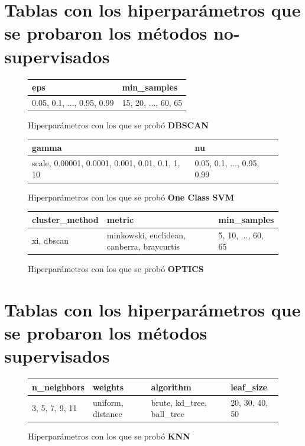 \begin{appendices}
	\section*{Tablas con los hiperparámetros que se probaron los métodos no-supervisados}
		\begin{figure}[htb]
			\centering
			\begin{tabular}{ll}
				\toprule
				                                          eps &                                  min\_samples \\
				\midrule
				  0.05, 0.1, ..., 0.95, 0.99 &  15, 20, ..., 60, 65 \\
				\bottomrule
			\end{tabular}
			\caption{Hiperparámetros con los que se probó \textbf{DBSCAN}}
			\label{table:4}
		\end{figure}
		
		\begin{figure}[htb]
			\centering
			\begin{tabular}{ll}
				\toprule
				                                            gamma &                                                 nu \\
				\midrule
				  scale, 0.00001, 0.0001, 0.001, 0.01, 0.1, 1, 10 &  0.05, 0.1, ..., 0.95, 0.99 \\
				\bottomrule
			\end{tabular}
			\caption{Hiperparámetros con los que se probó \textbf{One Class SVM}}
			\label{table:5}
		\end{figure}
		
		\begin{figure}[htb]
			\centering
			\begin{tabular}{lll}
				\toprule
				 cluster\_method &                                      metric &                                        min\_samples \\
				\midrule
				     xi, dbscan &  minkowski, euclidean, canberra, braycurtis &  5, 10, ..., 60, 65 \\
				\bottomrule
			\end{tabular}
			\caption{Hiperparámetros con los que se probó \textbf{OPTICS}}
			\label{table:6}
		\end{figure}

	\section*{Tablas con los hiperparámetros que se probaron los métodos supervisados}
		\begin{figure}[ht!]
			\centering
			\begin{tabular}{llll}
				\toprule
					   n\_neighbors &            weights &                  algorithm &       leaf\_size \\
				\midrule
				 3, 5, 7, 9, 11 &  uniform, distance &  brute, kd\_tree, ball\_tree &  20, 30, 40, 50 \\
				\bottomrule
			\end{tabular}
			\caption{Hiperparámetros con los que se probó \textbf{KNN}}
			\label{table:7}
		\end{figure}


\end{appendices}
